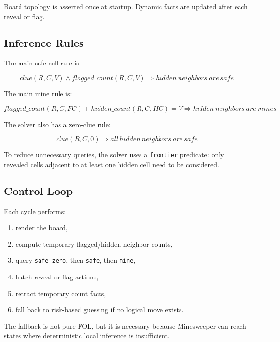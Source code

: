 \documentclass[11pt,a4paper]{article}
\newcommand{\code}[1]{\texttt{#1}}
\begin{document}
Board topology is asserted once at startup. Dynamic facts are updated after each reveal or flag.

\subsection{Inference Rules}

The main safe-cell rule is:

\begin{equation}
    clue(R,C,V) \land flagged\_count(R,C,V) \Rightarrow hidden\ neighbors\ are\ safe
\end{equation}

The main mine rule is:

\begin{equation}
    flagged\_count(R,C,FC) + hidden\_count(R,C,HC) = V \Rightarrow hidden\ neighbors\ are\ mines
\end{equation}

The solver also has a zero-clue rule:

\begin{equation}
    clue(R,C,0) \Rightarrow all\ hidden\ neighbors\ are\ safe
\end{equation}

To reduce unnecessary queries, the solver uses a \code{frontier} predicate: only revealed cells adjacent to at least one hidden cell need to be considered.

\subsection{Control Loop}

Each cycle performs:

\begin{enumerate}[leftmargin=*]
    \item render the board,
    \item compute temporary flagged/hidden neighbor counts,
    \item query \code{safe\_zero}, then \code{safe}, then \code{mine},
    \item batch reveal or flag actions,
    \item retract temporary count facts,
    \item fall back to risk-based guessing if no logical move exists.
\end{enumerate}

The fallback is not pure FOL, but it is necessary because Minesweeper can reach states where deterministic local inference is insufficient.
\end{document}
